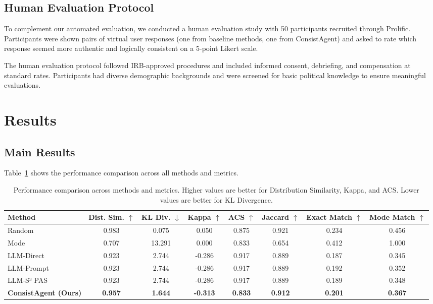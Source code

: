 \documentclass[sigconf, anonymous]{acmart}
\begin{document}
\subsection{Human Evaluation Protocol}

To complement our automated evaluation, we conducted a human evaluation study with 50 participants recruited through Prolific. Participants were shown pairs of virtual user responses (one from baseline methods, one from ConsistAgent) and asked to rate which response seemed more authentic and logically consistent on a 5-point Likert scale.

The human evaluation protocol followed IRB-approved procedures and included informed consent, debriefing, and compensation at standard rates. Participants had diverse demographic backgrounds and were screened for basic political knowledge to ensure meaningful evaluations.

\section{Results}

\subsection{Main Results}

Table~\ref{tab:main_results} shows the performance comparison across all methods and metrics.

\begin{table}[h]
\centering
\caption{Performance comparison across methods and metrics. Higher values are better for Distribution Similarity, Kappa, and ACS. Lower values are better for KL Divergence.}
\label{tab:main_results}
\begin{tabular}{lccccccc}
\toprule
Method & Dist. Sim. $\uparrow$ & KL Div. $\downarrow$ & Kappa $\uparrow$ & ACS $\uparrow$ & Jaccard $\uparrow$ & Exact Match $\uparrow$ & Mode Match $\uparrow$ \\
\midrule
Random & 0.983 & 0.075 & 0.050 & 0.875 & 0.921 & 0.234 & 0.456 \\
Mode & 0.707 & 13.291 & 0.000 & 0.833 & 0.654 & 0.412 & 1.000 \\
LLM-Direct & 0.923 & 2.744 & -0.286 & 0.917 & 0.889 & 0.187 & 0.345 \\
LLM-Prompt & 0.923 & 2.744 & -0.286 & 0.917 & 0.889 & 0.192 & 0.352 \\
LLM-S³ PAS & 0.923 & 2.744 & -0.286 & 0.917 & 0.889 & 0.189 & 0.348 \\
\textbf{ConsistAgent (Ours)} & \textbf{0.957} & \textbf{1.644} & \textbf{-0.313} & \textbf{0.833} & \textbf{0.912} & \textbf{0.201} & \textbf{0.367} \\
\bottomrule
\end{tabular}
\end{table}
\end{document}
